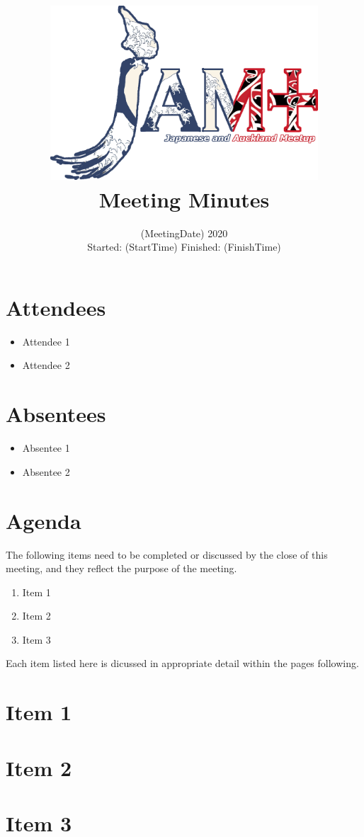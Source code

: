 \documentclass[12pt, a4paper]{article}
\title{
	\includegraphics[width=10cm]{jam-logo}\vspace{2ex} 
	\\ 
	\titlefont Meeting Minutes\vspace{-3ex}
}
\date{
\huge (MeetingDate) 2020 \\ \vspace{0.5ex}
\large Started: (StartTime) \quad Finished: (FinishTime)}
\begin{document}
\maketitle
\begin{minipage}[t]{0.5\textwidth}
\section*{Attendees}
\begin{itemize}
\item Attendee 1
\item Attendee 2
\end{itemize}
\end{minipage}
\begin{minipage}[t]{0.5\textwidth}
\section*{Absentees}
\begin{itemize}
\item Absentee 1
\item Absentee 2
\end{itemize}
\end{minipage}
\pagebreak
\section*{Agenda}
The following items need to be completed or discussed by the close of this meeting, and they reflect the purpose of the meeting.
\begin{enumerate}
\item Item 1
\item Item 2
\item Item 3
\end{enumerate}
Each item listed here is dicussed in appropriate detail within the pages following.
\pagebreak
\section{Item 1}
\section{Item 2}
\section{Item 3}
\pagebreak
\end{document}
